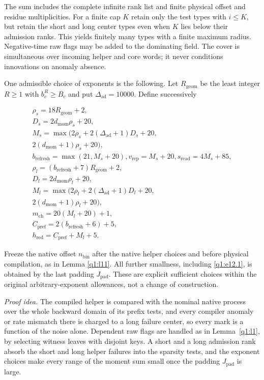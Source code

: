 \begin{lemma}
The sum includes the complete infinite rank list and finite physical offset and residue multiplicities. For a finite cap \(K\) retain only the test types with \(i\le K\), but retain the short and long center types even when \(K\) lies below their admission ranks. This yields finitely many types with a finite maximum radius. Negative-time raw flags may be added to the dominating field. The cover is simultaneous over incoming helper and core words; it never conditions innovations on anomaly absence.

One admissible choice of exponents is the following. Let \(R_{\mathrm{geom}}\) be the least integer \(R\ge 1\) with \(b_{c}^{R}\ge B_{c}\) and put \(\Delta_{\mathrm{ad}}=10000\). Define successively

\[
\begin{gathered}
\rho_{s}=18 R_{\mathrm{geom}}+2, \\ D_{s}=2 d_{\mathrm{mom}} \rho_{s}+20, \\ M_{s}=\max (2\rho_{s}+2(\Delta_{\mathrm{ad}}+1)D_{s}+20, \\ 2(d_{\mathrm{mom}}+1)\rho_{s}+20), \\ b_{\mathrm{refresh}}=\max (21,M_{s}+20), v_{\mathrm{rep}}=M_{s}+20, s_{\mathrm{read}}=4M_{s}+85, \\ \rho_{l}=(b_{\mathrm{refresh}}+7)R_{\mathrm{geom}}+2, \\ D_{l}=2 d_{\mathrm{mom}} \rho_{l}+20, \\ M_{l}=\max (2\rho_{l}+2(\Delta_{\mathrm{ad}}+1)D_{l}+20, \\ 2(d_{\mathrm{mom}}+1)\rho_{l}+20), \\ m_{\mathrm{ch}}=20(M_{l}+20)+1, \\ C_{\mathrm{pref}}=2(b_{\mathrm{refresh}}+6)+5, \\ h_{\mathrm{red}}=C_{\mathrm{pref}}+M_{l}+5.
\end{gathered}
\]

Freeze the native offset \(n_{\mathrm{bin}}\) after the native helper choices and before physical compilation, as in Lemma \ref{q1:l11}. All further smallness, including \eqref{q1:e12.1}, is obtained by the last padding \(J_{\mathrm{pad}}\). These are explicit sufficient choices within the original arbitrary-exponent allowances, not a change of construction.

\end{lemma}
\par\noindent\emph{Proof idea.} The compiled helper is compared with the nominal native process over the whole backward domain of its prefix tests, and every compiler anomaly or rate mismatch there is charged to a long failure center, so every mark is a function of the noise alone. Dependent raw flags are handled as in Lemma~\ref{q1:l1}, by selecting witness leaves with disjoint keys. A short and a long admission rank absorb the short and long helper failures into the sparsity tests, and the exponent choices make every range of the moment sum small once the padding \(J_{\mathrm{pad}}\) is large.

